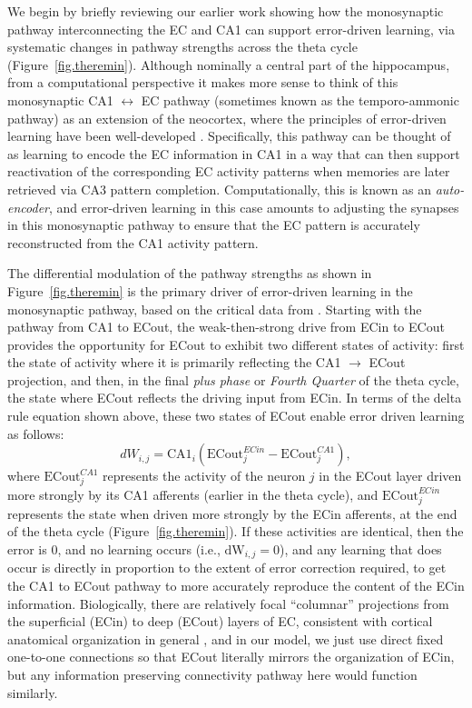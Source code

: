 \documentclass[11pt,twoside]{article}
\newif\myifpdf
\begin{document}
We begin by briefly reviewing our earlier work showing how the monosynaptic pathway interconnecting the EC and CA1 can support error-driven learning, via systematic changes in pathway strengths across the theta cycle \citep{KetzMorkondaOReilly13,HasselmoBodelonWyble02} (Figure~\ref{fig.theremin}).  Although nominally a central part of the hippocampus, from a computational perspective it makes more sense to think of this monosynaptic CA1 $\leftrightarrow$ EC pathway (sometimes known as the temporo-ammonic pathway) as an extension of the neocortex, where the principles of error-driven learning have been well-developed \citep{OReilly96,WhittingtonBogacz19,LillicrapSantoroMarrisEtAl20}.  Specifically, this pathway can be thought of as learning to encode the EC information in CA1 in a way that can then support reactivation of the corresponding EC activity patterns when memories are later retrieved via CA3 pattern completion.  Computationally, this is known as an \emph{auto-encoder}, and error-driven learning in this case amounts to adjusting the synapses in this monosynaptic pathway to ensure that the EC pattern is accurately reconstructed from the CA1 activity pattern.

The differential modulation of the pathway strengths as shown in Figure~\ref{fig.theremin} is the primary driver of error-driven learning in the monosynaptic pathway, based on the critical data from \citet{HasselmoBodelonWyble02}.  Starting with the pathway from CA1 to ECout, the weak-then-strong drive from ECin to ECout provides the opportunity for ECout to exhibit two different states of activity: first the state of activity where it is primarily reflecting the CA1 $\rightarrow$ ECout projection, and then, in the final \emph{plus phase} or \emph{Fourth Quarter} of the theta cycle, the state where ECout reflects the driving input from ECin.  In terms of the delta rule equation shown above, these two states of ECout enable error driven learning as follows:
\begin{equation}
\label{eq.ECoutEDL}
    dW_{i,j} = \mbox{CA1}_i ( \mbox{ECout}_j^{ECin} - \mbox{ECout}_j^{CA1} ) ,
\end{equation}
where $\mbox{ECout}_j^{CA1}$ represents the activity of the neuron $j$ in the ECout layer driven more strongly by its CA1 afferents (earlier in the theta cycle), and $\mbox{ECout}_j^{ECin}$ represents the state when driven more strongly by the ECin afferents, at the end of the theta cycle (Figure~\ref{fig.theremin}).  If these activities are identical, then the error is 0, and no learning occurs (i.e., $\mbox{dW}_{i,j} = 0$), and any learning that does occur is directly in proportion to the extent of error correction required, to get the CA1 to ECout pathway to more accurately reproduce the content of the ECin information.  Biologically, there are relatively focal ``columnar'' projections from the superficial (ECin) to deep (ECout) layers of EC, consistent with cortical anatomical organization in general \citep{WitterDoanJacobsenEtAl17}, and in our model, we just use direct fixed one-to-one connections so that ECout literally mirrors the organization of ECin, but any information preserving connectivity pathway here would function similarly.
\end{document}
